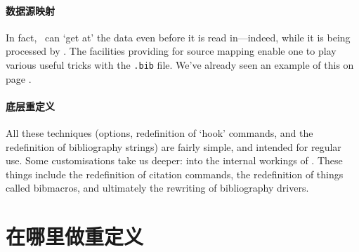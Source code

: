 \paragraph{数据源映射} In fact,
\biblatex\ can `get at' the data even before it is read in---indeed,
while it is being processed by . The facilities
providing for source mapping enable one to play various useful tricks
with the \verb|.bib| file. We've already seen an example of this on
page \pageref{datamap}.

\paragraph{底层重定义}
All these techniques (options, redefinition of `hook' commands, and
the redefinition of bibliography strings) are fairly simple, and
intended for regular use. Some customisations take us deeper: into the
internal workings of \biblatex. These things include the redefinition
of citation commands, the redefinition of things called bibmacros, and
ultimately the rewriting of bibliography drivers.

\section{在哪里做重定义}


